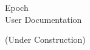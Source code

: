 \documentclass{memoir}
\begin{document}
\begin{flushright}
	\vspace*{2in}
	{\fontsize{50}{60}\selectfont Epoch}  \\
	\vspace{20pt}
	{\fontsize{30}{40}\selectfont User Documentation}
\end{flushright}

\newpage
\rfoot{\thepage}
(Under Construction)
\end{document}
